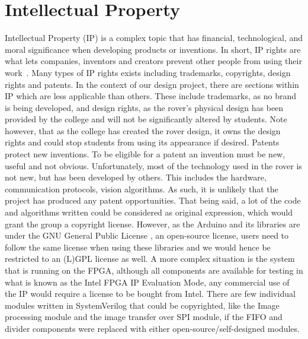 \documentclass[a4paper]{article}
\begin{document}
\section{Intellectual Property}
Intellectual Property (IP) is a complex topic that has financial, 
technological, and moral significance when developing products or 
inventions. In short, IP rights are what lets companies, inventors 
and creators prevent other people from using their work~\cite{perea}. 
Many types of IP rights exists including trademarks, copyrights, 
design rights and patents. In the context of our design project, 
there are sections within IP which are less applicable than others. 
These include trademarks, as no brand is being developed, and design 
rights, as the rover's physical design has been provided by the 
college and will not be significantly altered by students. Note 
however, that as the college has created the rover design, it owns 
the design rights and could stop students from using its appearance 
if desired. Patents protect new inventions. To be eligible for a 
patent an invention must be new, useful and not obvious. Unfortunately, 
most of the technology used in the rover is not new, but has been 
developed by others. This includes the hardware, communication protocols, 
vision algorithms. As such, it is unlikely that the project has 
produced any patent opportunities. That being said, a lot of the 
code and algorithms written could be considered as original expression, 
which would grant the group a copyright license. However, as the 
Arduino and its libraries are under the GNU General Public 
License \cite{ArduinoLicense}, an open-source license, users 
need to follow the same license when using these libraries and 
we would hence be restricted to an (L)GPL license as well. A more 
complex situation is the system that is running on the FPGA, although 
all components are available for testing in what is known as the Intel 
FPGA IP Evaluation Mode, any commercial use of the IP would require a 
license to be bought from Intel\cite{IntelEvalMode}. There are few 
individual modules written in SystemVerilog that could be copyrighted, 
like the Image processing module and the image transfer over SPI module, 
if the FIFO and divider components were replaced with either 
open-source/self-designed modules. 

 
\end{document}
